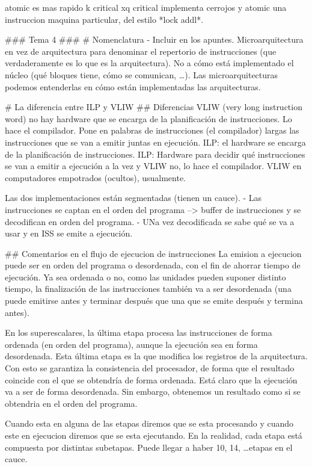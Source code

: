 atomic es mas rapido k critical xq critical implementa cerrojos y atomic una instruccion maquina particular, del estilo *lock addl*.

### Tema 4 ###
# Nomenclatura - Incluir en los apuntes.
Microarquitectura en vez de arquitectura para denominar el repertorio de instrucciones (que verdaderamente es lo que es la arquitectura). No a cómo está implementado el núcleo (qué bloques tiene, cómo se comunican, \ldots).
Las microarquitecturas podemos entenderlas en cómo están implementadas las arquitecturas.

# La diferencia entre ILP y VLIW 
## Diferencias
VLIW (very long instruction word) no hay hardware que se encarga de la planificación de instrucciones. Lo hace el compilador. Pone en palabras de instrucciones (el compilador) largas las instrucciones que se van a emitir juntas en ejecución.
ILP: el hardware se encarga de la planificación de instrucciones. 
ILP: Hardware para decidir qué instrucciones se van a emitir a ejecución a la vez y VLIW no, lo hace el compilador.
VLIW en computadores empotrados (ocultos), usualmente.

Las dos implementaciones están segmentadas (tienen un cauce).
- Las instrucciones se captan en el orden del programa --> buffer de instrucciones y se decodifican en orden del programa.
- UNa vez decodificada se sabe qué se va a usar y en ISS se emite a ejecución.

## Comentarios en el flujo de ejecucion de instrucciones
La emision a ejecucion puede ser en orden del programa o desordenada, con el fin de ahorrar tiempo de ejecución.
Ya sea ordenada o no, como las unidades pueden suponer distinto tiempo, la finalización de las instrucciones también va a ser desordenada (una puede emitirse antes y terminar después que una que se emite después y termina antes).

En los superescalares, la última etapa procesa las instrucciones de forma ordenada (en orden del programa), aunque la ejecución sea en forma desordenada.
Esta última etapa es la que modifica los registros de la arquitectura. Con esto se garantiza la consistencia del procesador, de forma que el resultado coincide con el que se obtendría de forma ordenada. Está claro que la ejecución va a ser de forma desordenada. Sin embargo, obtenemos un resultado como si se obtendria en el orden del programa.

Cuando esta en alguna de las etapas diremos que se esta procesando y cuando este en ejecucion diremos que se esta ejecutando.
En la realidad, cada etapa está compuesta por distintas subetapas. Puede llegar a haber 10, 14, \ldots etapas en el cauce.

